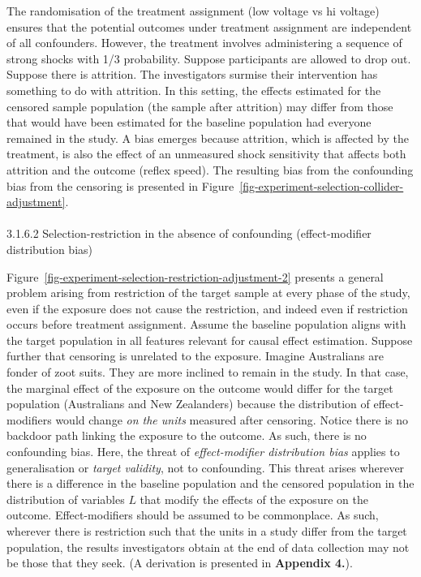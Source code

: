 \documentclass[
  singlecolumn]{article}
\makeatletter
\let\oldparagraph\paragraph
\renewcommand{\paragraph}{
    \@ifstar
      \xxxParagraphStar
      \xxxParagraphNoStar
  }
\newcommand{\xxxParagraphStar}[1]{\oldparagraph*{#1}\mbox{}}
\newcommand{\xxxParagraphNoStar}[1]{\oldparagraph{#1}\mbox{}}
\makeatother
\begin{document}
The randomisation of the treatment assignment (low voltage vs hi
voltage) ensures that the potential outcomes under treatment assignment
are independent of all confounders. However, the treatment involves
administering a sequence of strong shocks with 1/3 probability. Suppose
participants are allowed to drop out. Suppose there is attrition. The
investigators surmise their intervention has something to do with
attrition. In this setting, the effects estimated for the censored
sample population (the sample after attrition) may differ from those
that would have been estimated for the baseline population had everyone
remained in the study. A bias emerges because attrition, which is
affected by the treatment, is also the effect of an unmeasured shock
sensitivity that affects both attrition and the outcome (reflex speed).
The resulting bias from the confounding bias from the censoring is
presented in Figure~\ref{fig-experiment-selection-collider-adjustment}.

\paragraph{3.1.6.2 Selection-restriction in the absence of confounding
(effect-modifier distribution
bias)}\label{selection-restriction-in-the-absence-of-confounding-effect-modifier-distribution-bias}

Figure~\ref{fig-experiment-selection-restriction-adjustment-2} presents
a general problem arising from restriction of the target sample at every
phase of the study, even if the exposure does not cause the restriction,
and indeed even if restriction occurs before treatment assignment.
Assume the baseline population aligns with the target population in all
features relevant for causal effect estimation. Suppose further that
censoring is unrelated to the exposure. Imagine Australians are fonder
of zoot suits. They are more inclined to remain in the study. In that
case, the marginal effect of the exposure on the outcome would differ
for the target population (Australians and New Zealanders) because the
distribution of effect-modifiers would change \emph{on the units}
measured after censoring. Notice there is no backdoor path linking the
exposure to the outcome. As such, there is no confounding bias. Here,
the threat of \emph{effect-modifier distribution bias} applies to
generalisation or \emph{target validity}, not to confounding. This
threat arises wherever there is a difference in the baseline population
and the censored population in the distribution of variables \(L\) that
modify the effects of the exposure on the outcome. Effect-modifiers
should be assumed to be commonplace. As such, wherever there is
restriction such that the units in a study differ from the target
population, the results investigators obtain at the end of data
collection may not be those that they seek. (A derivation is presented
in \textbf{Appendix 4.}).
\end{document}
